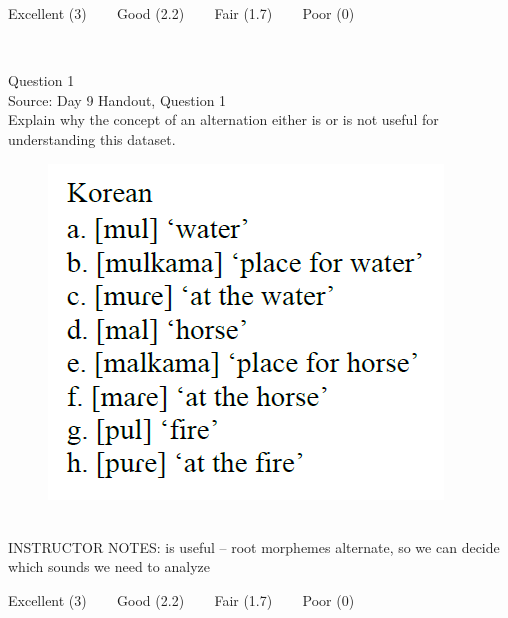\documentclass[12pt]{article}
\begin{document}
\vfill
Excellent (3) ~~~ Good (2.2) ~~~ Fair (1.7) ~~~ Poor (0)
\newpage

\begin{center}
\textbf{{\color{red}{\HUGE END OF EXAM}}}\\

\end{center}
\newpage

\begin{center}
\textbf{{\color{blue}{\HUGE START OF EXAM\\}}}

\textbf{{\color{blue}{\HUGE Student ID: 1743\\}}}

\textbf{{\color{blue}{\HUGE 3:20 - 3:40 PM\\}}}

\end{center}
\newpage

{\large Question 1}\\

Source: Day 9 Handout, Question 1\\

Explain why the concept of an alternation either is or is not useful for understanding this dataset.\\

\begin{figure}[H]
\includegraphics{../images/korean.png}
\end{figure}

~\\
INSTRUCTOR NOTES: is useful -- root morphemes alternate, so we can decide which sounds we need to analyze


\vfill
Excellent (3) ~~~ Good (2.2) ~~~ Fair (1.7) ~~~ Poor (0)
\newpage
\end{document}
